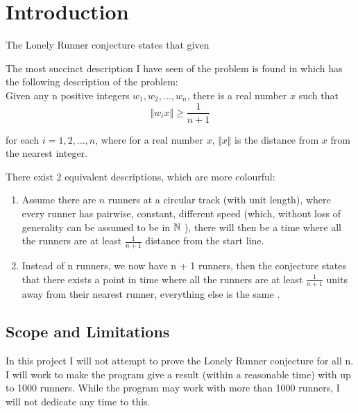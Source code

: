 \section{Introduction}
\label{introduction}

The Lonely Runner conjecture states that given 

The most succinct description I have seen of the problem is found in \cite{ANote} which has the following description of the problem:\\

Given any n positive integers $w_1, w_2, \ldots, w_n$, there is a real number $x$ such that 
$$
\Vert w_i x\Vert \geq \frac{1}{n+1}
$$

for each $i = 1, 2, \ldots, n$, where for a real number $x$, $\Vert x \Vert$ is the distance from $x$ from the nearest integer.

There exist 2 equivalent descriptions, which are more colourful:
\begin{enumerate}
\item Assume there are $n$ runners at a circular track (with unit length), where every runner has pairwise, constant, different speed (which, without loss of generality can be assumed to be in $\mathbb{N}$ \cite{Bienia97flows.view-obstructions} ), there will then be a time where all the runners are at least $\frac{1}{n + 1}$ distance from the start line.\\

\item Instead of n runners, we now have n + 1 runners, then the conjecture states that there exists a point in time where all the runners are at least $\frac{1}{n + 1}$ units away from their nearest runner, everything else is the same \cite{Bienia97flows.view-obstructions}.\\
\end{enumerate}

\subsection{Scope and Limitations}
\label{scope}
In this project I will not attempt to prove the Lonely Runner conjecture for all n. 
I will work to make the program give a result (within a reasonable time) with up to 1000 runners. While the program may work with more than 1000 runners, I will not dedicate any time to this.

